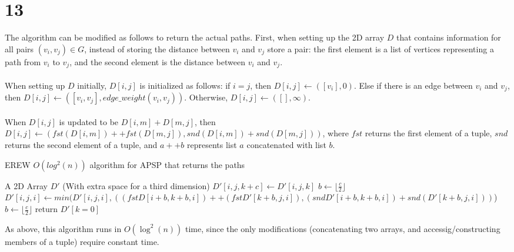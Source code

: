 \documentclass[letterpaper,notitlepage,twoside]{article}
\begin{document}
\section*{13}
The algorithm can be modified as follows to return the actual paths. First, when setting up the 2D array $D$ that contains information for all pairs $(v_i, v_j) \in G$, instead of storing the distance between $v_i$ and $v_j$ store a pair: the first element is a list of vertices representing a path from $v_i$ to $v_j$, and the second element is the distance between $v_i$ and $v_j$.
\\\\
When setting up $D$ initially, $D[i, j]$ is initialized as follows: if $i = j$, then $D[i, j] \gets ([v_i], 0)$. Else if there is an edge between $v_i$ and $v_j$, then $D[i, j] \gets ([v_i, v_j], edge\_weight(v_i, v_j))$. Otherwise, $D[i, j] \gets ([], \infty)$.
\\\\
When $D[i, j]$ is updated to be $D[i, m] + D[m, j]$, then $D[i, j] \gets (fst(D[i, m]) ++ fst(D[m, j]), snd(D[i, m]) + snd(D[m, j]))$, where $fst$ returns the first element of a tuple, $snd$ returns the second element of a tuple, and $a ++ b$ represents list $a$ concatenated with list $b$.
\begin{algorithm}[H]
  \begin{algorithmic}%
    \caption{EREW $O(log^{2} (n))$ algorithm for APSP that returns the paths}
    \Require A 2D Array $D'$ (With extra space for a third dimension)
    		\State $D'[i, j, k+c] \gets D'[i, j, k]$ 
    	\EndIf
    \EndWhile
    \State $b \gets \lfloor{\frac{c}{2}}\rfloor$
        	\State $D'[i, j, i] \gets min(D'[i, j, i], ((fstD[i+b, k+b, i]) ++ (fstD'[k+b, j, i]), (sndD'[i+b, k+b, i]) + snd(D'[k+b, j, i]))$) 
            \State $b \gets \lfloor{\frac{c}{2}}\rfloor$ 
	\EndWhile
		\State return $D'[k = 0]$ 
	\EndIf
  \end{algorithmic}
\end{algorithm}

As above, this algorithm runs in $O(\log^2(n))$ time, since the only modifications (concatenating two arrays, and accessig/constructing members of a tuple) require constant time.
\end{document}
